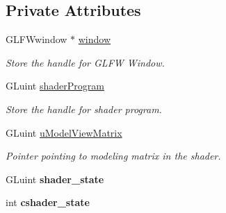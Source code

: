 \subsection*{Private Attributes}
\begin{DoxyCompactItemize}
\item 
G\+L\+F\+Wwindow $\ast$ \hyperlink{classcft_1_1Scene_a5743ac5a5872b962da380e6b8262a347}{window}\hypertarget{classcft_1_1Scene_a5743ac5a5872b962da380e6b8262a347}{}\label{classcft_1_1Scene_a5743ac5a5872b962da380e6b8262a347}

\begin{DoxyCompactList}\small\item\em Store the handle for G\+L\+FW Window. \end{DoxyCompactList}\item 
G\+Luint \hyperlink{classcft_1_1Scene_a33b8e992a20a9a5ed8efc9c9f9959591}{shader\+Program}\hypertarget{classcft_1_1Scene_a33b8e992a20a9a5ed8efc9c9f9959591}{}\label{classcft_1_1Scene_a33b8e992a20a9a5ed8efc9c9f9959591}

\begin{DoxyCompactList}\small\item\em Store the handle for shader program. \end{DoxyCompactList}\item 
G\+Luint \hyperlink{classcft_1_1Scene_a9bac78af74e8c14b1ae9babcf44d1c18}{u\+Model\+View\+Matrix}\hypertarget{classcft_1_1Scene_a9bac78af74e8c14b1ae9babcf44d1c18}{}\label{classcft_1_1Scene_a9bac78af74e8c14b1ae9babcf44d1c18}

\begin{DoxyCompactList}\small\item\em Pointer pointing to modeling matrix in the shader. \end{DoxyCompactList}\item 
G\+Luint {\bfseries shader\+\_\+state}\hypertarget{classcft_1_1Scene_a2004a0d53bcd06f76bb4e3cc86290b06}{}\label{classcft_1_1Scene_a2004a0d53bcd06f76bb4e3cc86290b06}

\item 
int {\bfseries cshader\+\_\+state}\hypertarget{classcft_1_1Scene_a4eedebe81bff5c376ec42b39d34c4f6b}{}\label{classcft_1_1Scene_a4eedebe81bff5c376ec42b39d34c4f6b}

\end{DoxyCompactItemize}
{\bf }\par
